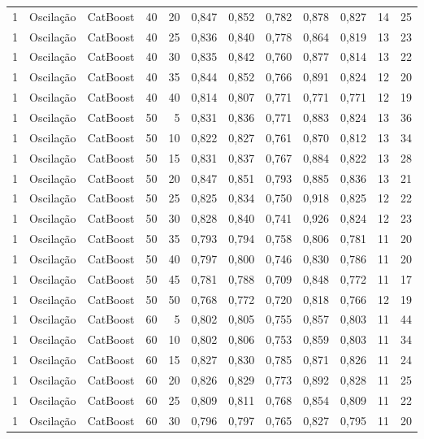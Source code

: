 \begin{longtable}{@{}rllrrrrrrrrr@{}}
1 & Oscilação & CatBoost & 40 & 20 & 0,847 & 0,852 & 0,782 & 0,878 & 0,827 & 14 & 25 \\
1 & Oscilação & CatBoost & 40 & 25 & 0,836 & 0,840 & 0,778 & 0,864 & 0,819 & 13 & 23 \\
1 & Oscilação & CatBoost & 40 & 30 & 0,835 & 0,842 & 0,760 & 0,877 & 0,814 & 13 & 22 \\
1 & Oscilação & CatBoost & 40 & 35 & 0,844 & 0,852 & 0,766 & 0,891 & 0,824 & 12 & 20 \\
1 & Oscilação & CatBoost & 40 & 40 & 0,814 & 0,807 & 0,771 & 0,771 & 0,771 & 12 & 19 \\
1 & Oscilação & CatBoost & 50 & 5 & 0,831 & 0,836 & 0,771 & 0,883 & 0,824 & 13 & 36 \\
1 & Oscilação & CatBoost & 50 & 10 & 0,822 & 0,827 & 0,761 & 0,870 & 0,812 & 13 & 34 \\
1 & Oscilação & CatBoost & 50 & 15 & 0,831 & 0,837 & 0,767 & 0,884 & 0,822 & 13 & 28 \\
1 & Oscilação & CatBoost & 50 & 20 & 0,847 & 0,851 & 0,793 & 0,885 & 0,836 & 13 & 21 \\
1 & Oscilação & CatBoost & 50 & 25 & 0,825 & 0,834 & 0,750 & 0,918 & 0,825 & 12 & 22 \\
1 & Oscilação & CatBoost & 50 & 30 & 0,828 & 0,840 & 0,741 & 0,926 & 0,824 & 12 & 23 \\
1 & Oscilação & CatBoost & 50 & 35 & 0,793 & 0,794 & 0,758 & 0,806 & 0,781 & 11 & 20 \\
1 & Oscilação & CatBoost & 50 & 40 & 0,797 & 0,800 & 0,746 & 0,830 & 0,786 & 11 & 20 \\
1 & Oscilação & CatBoost & 50 & 45 & 0,781 & 0,788 & 0,709 & 0,848 & 0,772 & 11 & 17 \\
1 & Oscilação & CatBoost & 50 & 50 & 0,768 & 0,772 & 0,720 & 0,818 & 0,766 & 12 & 19 \\
1 & Oscilação & CatBoost & 60 & 5 & 0,802 & 0,805 & 0,755 & 0,857 & 0,803 & 11 & 44 \\
1 & Oscilação & CatBoost & 60 & 10 & 0,802 & 0,806 & 0,753 & 0,859 & 0,803 & 11 & 34 \\
1 & Oscilação & CatBoost & 60 & 15 & 0,827 & 0,830 & 0,785 & 0,871 & 0,826 & 11 & 24 \\
1 & Oscilação & CatBoost & 60 & 20 & 0,826 & 0,829 & 0,773 & 0,892 & 0,828 & 11 & 25 \\
1 & Oscilação & CatBoost & 60 & 25 & 0,809 & 0,811 & 0,768 & 0,854 & 0,809 & 11 & 22 \\
1 & Oscilação & CatBoost & 60 & 30 & 0,796 & 0,797 & 0,765 & 0,827 & 0,795 & 11 & 20 \\

\end{longtable}
